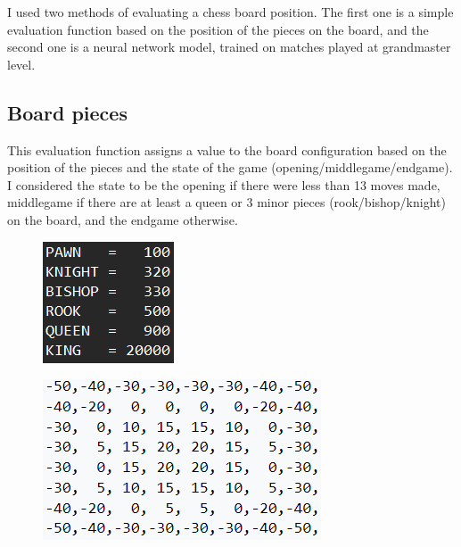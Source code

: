 I used two methods of evaluating a chess board position. The first one is a simple evaluation function based on the position of the pieces on the board, and the second one is a neural network model, trained on matches played at grandmaster level.

\subsection{Board pieces}
\label{subsec:ch4sec3subsec1}

This evaluation function assigns a value to the board configuration based on the position of the pieces and the state of the game (opening/middlegame/endgame). I considered the state to be the opening if there were less than 13 moves made, middlegame if there are at least a queen or 3 minor pieces (rook/bishop/knight) on the board, and the endgame otherwise.

\begin{figure}[h]
    \centering
    \begin{minipage}{.49\textwidth}
      \centering
      \includegraphics{figures/pieces_values.png}
      \label{fig:piecesValues}
    \end{minipage}
    \begin{minipage}{.49\textwidth}
      \centering
      \includegraphics{figures/knight_value_table.png}
      \label{fig:knightValueTable}
    \end{minipage}
\end{figure}

